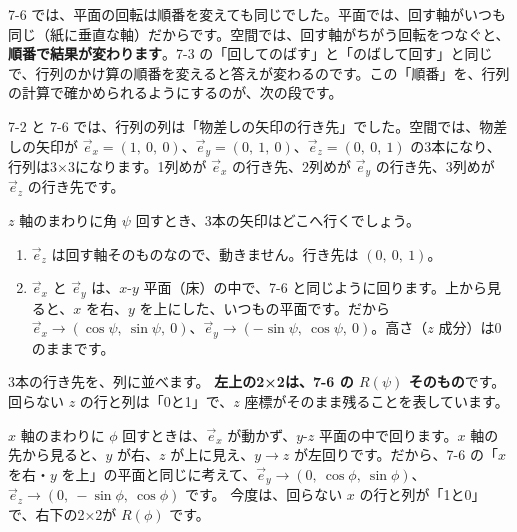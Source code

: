 7-6 では、平面の回転は順番を変えても同じでした。平面では、回す軸がいつも同じ（紙に垂直な軸）だからです。空間では、回す軸がちがう回転をつなぐと、\textbf{順番で結果が変わります}。7-3 の「回してのばす」と「のばして回す」と同じで、行列のかけ算の順番を変えると答えが変わるのです。この「順番」を、行列の計算で確かめられるようにするのが、次の段です。



\label{bk:7-7:rz}7-2 と 7-6 では、行列の列は「物差しの矢印の行き先」でした。空間では、物差しの矢印が $\vec e_x=(1,\ 0,\ 0)$、$\vec e_y=(0,\ 1,\ 0)$、$\vec e_z=(0,\ 0,\ 1)$ の3本になり、行列は3×3になります。1列めが $\vec e_x$ の行き先、2列めが $\vec e_y$ の行き先、3列めが $\vec e_z$ の行き先です。

$z$ 軸のまわりに角 $\psi$ 回すとき、3本の矢印はどこへ行くでしょう。
\begin{enumerate}[label={\bkcircled{\arabic*}}, leftmargin=2.4\zw, itemsep=2pt, topsep=2pt]
\item $\vec e_z$ は回す軸そのものなので、動きません。行き先は $(0,\ 0,\ 1)$。
\item $\vec e_x$ と $\vec e_y$ は、$x$-$y$ 平面（床）の中で、7-6 と同じように回ります。上から見ると、$x$ を右、$y$ を上にした、いつもの平面です。だから $\vec e_x\to(\cos\psi,\ \sin\psi,\ 0)$、$\vec e_y\to(-\sin\psi,\ \cos\psi,\ 0)$。高さ（$z$ 成分）は0のままです。
\end{enumerate}
3本の行き先を、列に並べます。
\textbf{左上の2×2は、7-6 の $R(\psi)$ そのもの}です。回らない $z$ の行と列は「0と1」で、$z$ 座標がそのまま残ることを表しています。


\label{bk:7-7:rx}$x$ 軸のまわりに $\phi$ 回すときは、$\vec e_x$ が動かず、$y$-$z$ 平面の中で回ります。$x$ 軸の先から見ると、$y$ が右、$z$ が上に見え、$y\to z$ が左回りです。だから、7-6 の「$x$ を右・$y$ を上」の平面と同じに考えて、$\vec e_y\to(0,\ \cos\phi,\ \sin\phi)$、$\vec e_z\to(0,\ -\sin\phi,\ \cos\phi)$ です。
今度は、回らない $x$ の行と列が「1と0」で、右下の2×2が $R(\phi)$ です。


